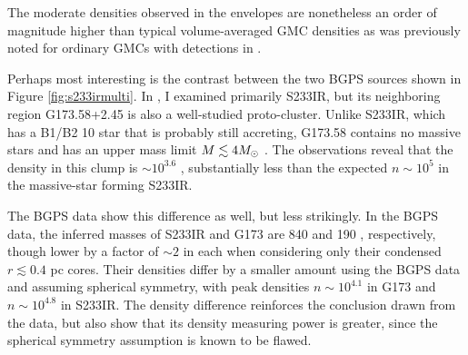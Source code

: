 The moderate densities observed in the envelopes are nonetheless an order of
magnitude higher than typical volume-averaged GMC densities
\citep{Roman-Duval2010} as was previously noted for ordinary GMCs with
\formaldehyde detections in \citet{Ginsburg2011}. 

Perhaps most interesting is the contrast between the two BGPS sources shown 
in Figure \ref{fig:s233irmulti}.  In \citet{Ginsburg2009}, I examined primarily
S233IR, but its neighboring region G173.58+2.45 is also a well-studied proto-cluster.
Unlike S233IR, which has a B1/B2 10 \msun star that is probably still accreting,
G173.58 contains no massive stars and has an upper mass limit $M\lesssim4 M_{\odot}$
\citep{Shepherd2002}.  The \formaldehyde observations reveal that the density in this
clump is $\sim10^{3.6}$ \percc, substantially less than the expected $n\sim10^5$ \percc
in the massive-star forming S233IR.

The BGPS data show this difference as well, but less strikingly.  In the BGPS
data, the inferred masses of S233IR and G173 are 840 and 190 \msun,
respectively, though lower by a factor of $\sim2$ in each when considering only
their condensed $r\lesssim0.4$ pc cores.  Their densities differ by a smaller
amount using the BGPS data and assuming spherical symmetry, with peak densities
$n\sim10^{4.1}$ in G173 and $n\sim10^{4.8}$ in S233IR.  The density difference
reinforces the conclusion drawn from the \formaldehyde data, but also show that its
density measuring power is greater, since the spherical symmetry assumption is known
to be flawed.

%

